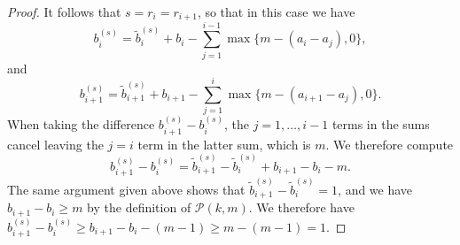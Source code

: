 \documentclass[10pt,a4paper]{amsart}
\begin{document}
\begin{proof}
    It follows that $s = r_i=r_{i+1}$, so that in this case we have
    \[ b^{(s)}_i = \tilde{b}^{(s)}_i + b_i- \sum_{j=1}^{i-1}\max\{m-(a_i-a_j),0\}, \]
    and 
    \[ b^{(s)}_{i+1} = \tilde{b}^{(s)}_{i+1} + b_{i+1}- \sum_{j=1}^{i}\max\{m-(a_{i+1}-a_j),0\}. \]
    When taking the difference $b^{(s)}_{i+1}-b^{(s)}_i$, the $j=1,\dots,i-1$ terms in the sums cancel leaving the $j=i$ term in the latter sum, which is $m$. We therefore compute
    \[ b^{(s)}_{i+1}-b^{(s)}_i = \tilde{b}^{(s)}_{i+1}-\tilde{b}^{(s)}_i+b_{i+1}-b_i-m. \]
    The same argument given above shows that $\tilde{b}^{(s)}_{i+1}-\tilde{b}^{(s)}_i = 1$, and we have $b_{i+1}-b_i\geq m$ by the definition of $\mathcal{P}(k,m)$. We therefore have $b^{(s)}_{i+1}-b^{(s)}_i \geq b_{i+1}-b_i-(m-1)\geq m-(m-1) = 1$. 
\end{proof}
\end{document}
